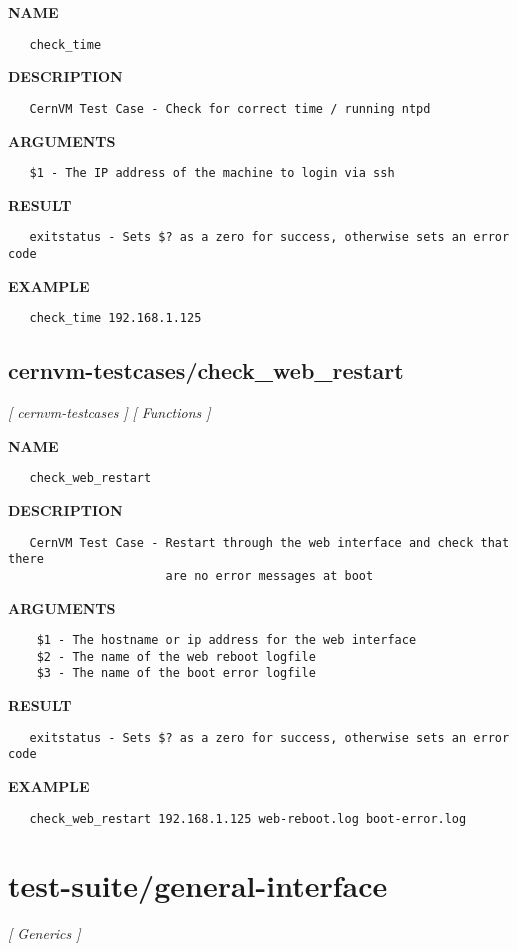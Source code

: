 \label{ch:robo17}
\label{ch:cernvm_testcases_check_time}
\textbf{NAME}
\begin{verbatim}
   check_time
\end{verbatim}
\textbf{DESCRIPTION}
\begin{verbatim}
   CernVM Test Case - Check for correct time / running ntpd
\end{verbatim}
\textbf{ARGUMENTS}
\begin{verbatim}
   $1 - The IP address of the machine to login via ssh
\end{verbatim}
\textbf{RESULT}
\begin{verbatim}
   exitstatus - Sets $? as a zero for success, otherwise sets an error code
\end{verbatim}
\textbf{EXAMPLE}
\begin{verbatim}
   check_time 192.168.1.125
\end{verbatim}
\newpage
\subsection{cernvm-testcases/check\_web\_restart}
\textsl{[ cernvm-testcases ]}
\textsl{[ Functions ]}

\label{ch:robo18}
\label{ch:cernvm_testcases_check_web_restart}
\textbf{NAME}
\begin{verbatim}
   check_web_restart
\end{verbatim}
\textbf{DESCRIPTION}
\begin{verbatim}
   CernVM Test Case - Restart through the web interface and check that there
                      are no error messages at boot
\end{verbatim}
\textbf{ARGUMENTS}
\begin{verbatim}
    $1 - The hostname or ip address for the web interface
    $2 - The name of the web reboot logfile
    $3 - The name of the boot error logfile
\end{verbatim}
\textbf{RESULT}
\begin{verbatim}
   exitstatus - Sets $? as a zero for success, otherwise sets an error code
\end{verbatim}
\textbf{EXAMPLE}
\begin{verbatim}
   check_web_restart 192.168.1.125 web-reboot.log boot-error.log
\end{verbatim}
\newpage
\section{test-suite/general-interface}
\textsl{[ Generics ]}

